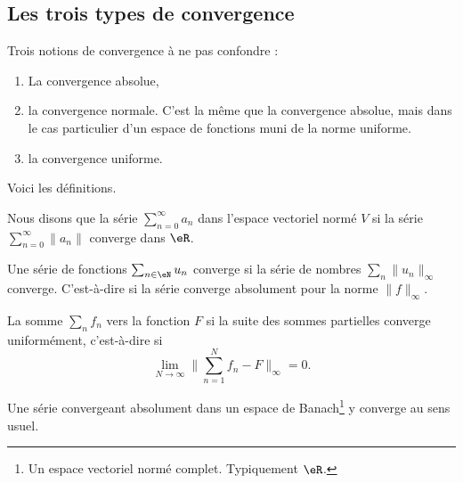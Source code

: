 \subsection{Les trois types de convergence}

Trois notions de convergence à ne pas confondre :
\begin{enumerate}
    \item
        La convergence absolue,
    \item
        la convergence normale. C'est la même que la convergence absolue, mais dans le cas particulier d'un espace de fonctions muni de la norme uniforme.
    \item
        la convergence uniforme.
\end{enumerate}
Voici les définitions.


\begin{definition} \label{DefVFUIXwU}
    Nous disons que la série \( \sum_{n=0}^{\infty}a_n\) dans l'espace vectoriel normé \( V\)  si la série \( \sum_{n=0}^{\infty}\| a_n \|\) converge dans \( \eR\).
\end{definition}

\begin{definition} \label{DefVBrJUxo}
    Une série de fonctions \( \sum_{n\in \eN}u_n \) converge  si la série de nombres \( \sum_n\| u_n \|_{\infty}\) converge. C'est-à-dire si la série converge absolument pour la norme \( \| f \|_{\infty}\).
\end{definition}


\begin{definition}
    La somme \( \sum_nf_n\)  vers la fonction \( F\) si la suite des sommes partielles converge uniformément, c'est-à-dire si
    \begin{equation}        \label{EqLNCJooVCTiIw}
        \lim_{N\to \infty} \| \sum_{n=1}^Nf_n-F \|_{\infty}=0.
    \end{equation}
\end{definition}

\begin{proposition} \label{PropAKCusNM}
    Une série convergeant absolument dans un espace de Banach\footnote{Un espace vectoriel normé complet. Typiquement \( \eR\).} y converge au sens usuel.
\end{proposition}

